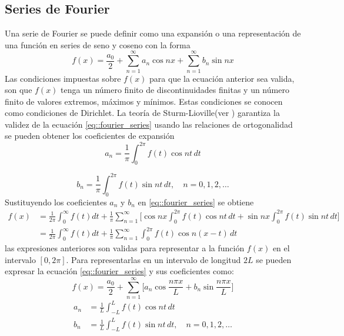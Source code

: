 \documentclass[a4paper]{article}
\begin{document}
\subsection{Series de Fourier}
Una serie de Fourier se puede definir como una expansión o una representación de una función en series de seno y coseno con la forma 
\begin{equation}\label{eq::fourier_series}
f(x)=\frac{a_0}{2}+\sum_{n=1}^\infty a_n \cos nx + \sum_{n=1}^\infty b_n \sin nx
\end{equation}
Las condiciones impuestas sobre $f(x)$ para que la ecuación anterior sea valida, son que $f(x)$ tenga un número finito de discontinuidades finitas y un número finito de valores extremos, máximos y mínimos. Estas condiciones se conocen como condiciones de Dirichlet. La teoría de Sturm-Lioville(ver \cite{Arfken}) garantiza la validez de la ecuación \ref{eq::fourier_series} usando las relaciones de ortogonalidad se pueden obtener los coeficientes de expansión
\begin{equation*}
a_n=\frac{1}{\pi} \int^{2\pi}_0 f(t) \cos{nt}\, dt
\end{equation*}

\begin{equation*}
b_n=\frac{1}{\pi} \int^{2\pi}_0 f(t) \sin{nt}\, dt, \,\,\,\,\,\, n=0,1,2,\hdots
\end{equation*}
Sustituyendo los coeficientes $a_n$ y $b_n$ en \ref{eq::fourier_series} se obtiene
\begin{equation}
\begin{aligned}
f(x)&=\frac{1}{2\pi}\int_0^\infty f(t)dt+\frac{1}{\pi}\sum_{n=1}^\infty\Big[ \cos{nx}\int_0^{2\pi} f(t) \cos{nt}\,dt + \sin{nx}\int_0^{2\pi} f(t) \sin{nt}\,dt \Big]\\
&=\frac{1}{2\pi}\int_0^\infty f(t)dt+\frac{1}{\pi}\sum^\infty_{n=1} \int^{2\pi}_0 f(t)\cos{n(x-t)\,dt}
\end{aligned}
\end{equation}
las expresiones anteriores son validas para representar a la función $f(x)$ en el intervalo $[0,2\pi]$. Para representarlas en un intervalo de longitud $2L$ se pueden expresar la ecuación \ref{eq::fourier_series} y sus coeficientes como:
\begin{equation}
f(x)=\frac{a_0}{2}+\sum_{n=1}^\infty \Big[ a_n \cos{\frac{n\pi x}{L}} + b_n \sin{\frac{n\pi x}{L}} \Big]
\end{equation}
\begin{equation*}
\begin{aligned}
a_n&=\frac{1}{L} \int^{L}_{-L} f(t) \cos{nt}\, dt \\
b_n&=\frac{1}{L} \int^{L}_{-L} f(t) \sin{nt}\, dt, \,\,\,\,\,\, n=0,1,2,\hdots
\end{aligned}
\end{equation*}
\end{document}
